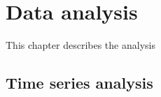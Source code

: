 \chapter{Data analysis}
\label{cha:data_analysis}

This chapter describes the analysis

\section{Time series analysis}
\label{sec:time_series_analysis}
